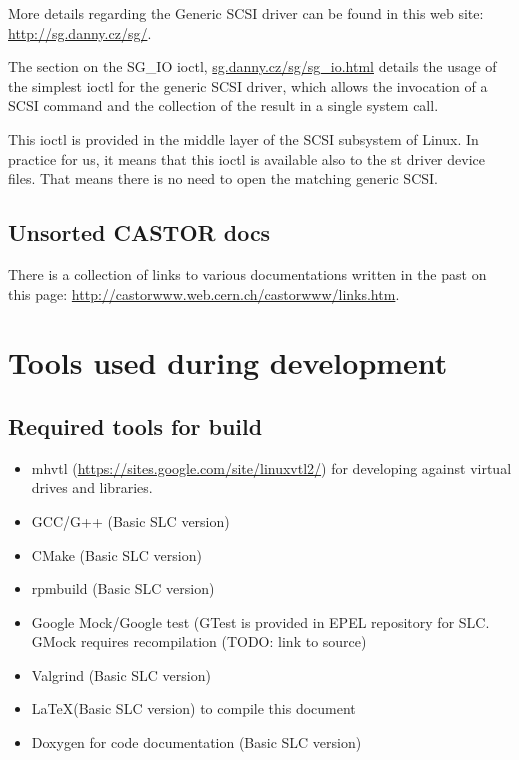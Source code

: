 More details regarding the Generic SCSI driver can be found in this web site: 
\href{http://sg.danny.cz/sg/}{http://sg.danny.cz/sg/}.

The section on the SG\_IO ioctl, \href{sg.danny.cz/sg/sg\_io.html}{sg.danny.cz/sg/sg\_io.html} details the usage of the 
simplest ioctl for the generic SCSI driver, which allows the invocation of a SCSI command and the collection of the 
result in a single system call.

This ioctl is provided in the middle layer of the SCSI subsystem of Linux. In practice for us, it means that this 
ioctl is available also to the st driver device files. That means there is no need to open the matching generic SCSI.

\subsection{Unsorted CASTOR docs}
There is a collection of links to various documentations written in the past on this page:
\href{http://castorwww.web.cern.ch/castorwww/links.htm}{http://castorwww.web.cern.ch/castorwww/links.htm}.

\section{Tools used during development}
\subsection{ Required tools for build}
\begin{itemize}
\item{}mhvtl (\href{https://sites.google.com/site/linuxvtl2/}{https://sites.google.com/site/linuxvtl2/}) for developing against virtual drives and libraries.
\item{}GCC/G++ (Basic SLC version)
\item{}CMake (Basic SLC version)
\item{}rpmbuild (Basic SLC version)
\item{}Google Mock/Google test (GTest is provided in EPEL repository for SLC. 
  GMock requires recompilation (TODO: link to source)
\item{}Valgrind (Basic SLC version)
\item{}\LaTeX (Basic SLC version) to compile this document
\item{}Doxygen for code documentation (Basic SLC version)
\end{itemize}

